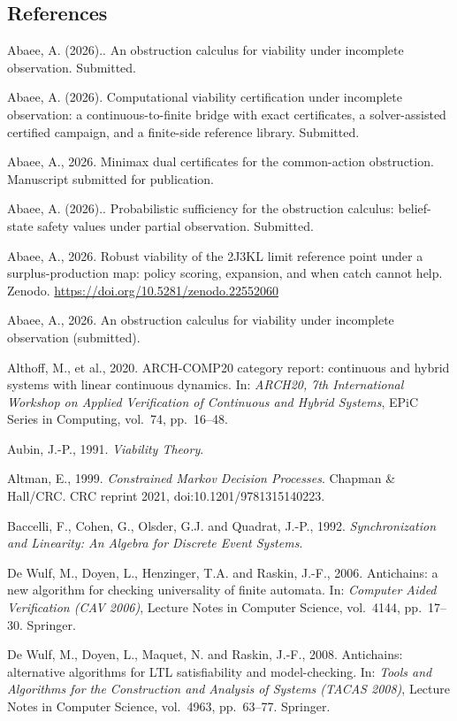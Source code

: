 \documentclass[10pt,twocolumn]{article}
\theoremstyle{plain}
\theoremstyle{definition}
\theoremstyle{remark}
\begin{document}
\subsection*{References}
\label{references}
Abaee, A. (2026).. An obstruction calculus for viability under incomplete observation. Submitted.

Abaee, A. (2026). Computational viability certification under incomplete
observation: a continuous-to-finite bridge with exact certificates, a
solver-assisted certified campaign, and a finite-side reference library.
Submitted.

Abaee, A., 2026. Minimax dual certificates for the common-action
obstruction. Manuscript submitted for publication.

Abaee, A. (2026).. Probabilistic sufficiency for the obstruction calculus: belief-state safety values under partial observation. Submitted.

Abaee, A., 2026. Robust viability of the 2J3KL limit reference point
under a surplus-production map: policy scoring, expansion, and when
catch cannot help. Zenodo.
\url{https://doi.org/10.5281/zenodo.22552060}

Abaee, A., 2026. An obstruction calculus for viability under
incomplete observation (submitted).

Althoff, M., et al., 2020. ARCH-COMP20 category report: continuous and hybrid systems with
linear continuous dynamics. In: \emph{ARCH20, 7th International Workshop on Applied
Verification of Continuous and Hybrid Systems}, EPiC Series in Computing, vol.~74, pp.~16--48.

Aubin, J.-P., 1991. \emph{Viability Theory}.

Altman, E., 1999. \emph{Constrained Markov Decision Processes}. Chapman \& Hall/CRC. CRC
reprint 2021, doi:10.1201/9781315140223.

Baccelli, F., Cohen, G., Olsder, G.J. and Quadrat, J.-P., 1992. \emph{Synchronization and
Linearity: An Algebra for Discrete Event Systems}.


De Wulf, M., Doyen, L., Henzinger, T.A. and Raskin, J.-F., 2006. Antichains: a new
algorithm for checking universality of finite automata. In: \emph{Computer Aided
Verification (CAV 2006)}, Lecture Notes in Computer Science, vol.~4144, pp.~17--30.
Springer.

De Wulf, M., Doyen, L., Maquet, N. and Raskin, J.-F., 2008. Antichains: alternative
algorithms for LTL satisfiability and model-checking. In: \emph{Tools and Algorithms
for the Construction and Analysis of Systems (TACAS 2008)}, Lecture Notes in Computer
Science, vol.~4963, pp.~63--77. Springer.
\end{document}
